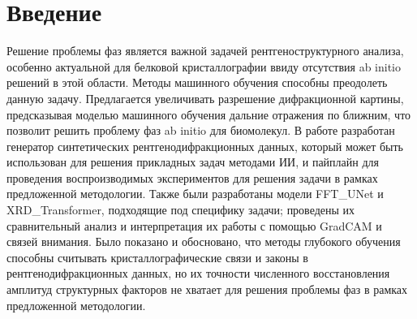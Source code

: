 \section*{Введение}

Решение проблемы фаз является важной задачей рентгеноструктурного анализа, особенно актуальной для белковой кристаллографии ввиду отсутствия ab initio решений в этой области. Методы машинного обучения способны преодолеть данную задачу. Предлагается увеличивать разрешение дифракционной картины, предсказывая моделью машинного обучения дальние отражения по ближним, что позволит решить проблему фаз ab initio для биомолекул. В работе разработан генератор синтетических рентгенодифракционных данных, который может быть использован для решения прикладных задач методами ИИ, и пайплайн для проведения воспроизводимых экспериментов для решения задачи в рамках предложенной методологии. Также были разработаны модели FFT\_UNet и XRD\_Transformer, подходящие под специфику задачи; проведены их сравнительный анализ и интерпретация их работы с помощью GradCAM и связей внимания. Было показано и обосновано, что методы глубокого обучения способны считывать кристаллографические связи и законы в рентгенодифракционных данных, но их точности численного восстановления амплитуд структурных факторов не хватает для решения проблемы фаз в рамках предложенной методологии. 

